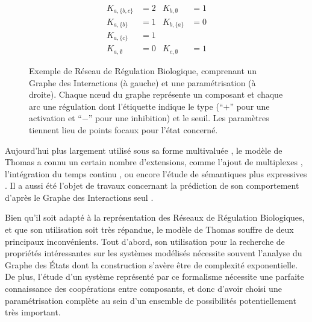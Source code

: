 \begin{figure}[ht]
\begin{minipage}{0.4\linewidth}
\centering
{}
\end{minipage}
\begin{minipage}{0.6\linewidth}
\centering
\begin{align*}
K_{a,\{b,c\}} &= 2 & K_{b,\emptyset} &= 1 \\
K_{a,\{b\}} &= 1 & K_{b,\{a\}} &= 0 \\
K_{a,\{c\}} &= 1 &&\\
K_{a,\emptyset} &= 0 & K_{c,\emptyset} &= 1
\end{align*}
\end{minipage}
\caption{\label{fig:exRRB}
Exemple de Réseau de Régulation Biologique, comprenant un Graphe des Interactions (à gauche) et une paramétrisation (à droite).
Chaque nœud du graphe représente un composant et chaque arc une régulation
dont l'étiquette indique le type (“$+$” pour une activation et “$-$” pour une inhibition) et le seuil.
Les paramètres tiennent lieu de points focaux pour l'état concerné.
}
\end{figure}

Aujourd'hui plus largement utilisé sous sa forme multivaluée \cite{richard-comet-bernot-08}, le modèle de Thomas a connu un certain nombre d'extensions,
comme l'ajout de multiplexes \cite{bernot-comet-khalis-08},
l'intégration du temps continu \cite{Ahmad08},
ou encore l'étude de sémantiques plus expressives \cite{BernotSemBRN}.
Il a aussi été l'objet de travaux concernant la prédiction de son comportement d'après le Graphe des Interactions seul \cite{RiCo07}.

Bien qu'il soit adapté à la représentation des Réseaux de Régulation Biologiques, et que son utilisation soit très répandue, le modèle de Thomas souffre de deux principaux inconvénients.
Tout d'abord, son utilisation pour la recherche de propriétés intéressantes sur les systèmes modélisés nécessite souvent l'analyse du Graphe des États dont la construction s'avère être de complexité exponentielle.
De plus, l'étude d'un système représenté par ce formalisme nécessite une parfaite connaissance des coopérations entre composants, et donc d'avoir choisi une paramétrisation complète au sein d'un ensemble de possibilités potentiellement très important.




